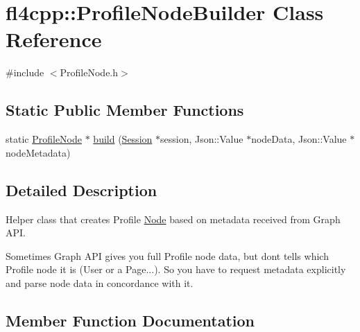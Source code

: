 \hypertarget{classfl4cpp_1_1_profile_node_builder}{}\section{fl4cpp\+:\+:Profile\+Node\+Builder Class Reference}
\label{classfl4cpp_1_1_profile_node_builder}


{\ttfamily \#include $<$Profile\+Node.\+h$>$}

\subsection*{Static Public Member Functions}
\begin{DoxyCompactItemize}
\item 
static \hyperlink{classfl4cpp_1_1_profile_node}{Profile\+Node} $\ast$ \hyperlink{classfl4cpp_1_1_profile_node_builder_a72df89a17997f581256b29fc2d525beb}{build} (\hyperlink{classfl4cpp_1_1_session}{Session} $\ast$session, Json\+::\+Value $\ast$node\+Data, Json\+::\+Value $\ast$node\+Metadata)
\end{DoxyCompactItemize}


\subsection{Detailed Description}
Helper class that creates Profile \hyperlink{classfl4cpp_1_1_node}{Node} based on metadata received from Graph A\+PI.

Sometimes Graph A\+PI gives you full Profile node data, but dont tells which Profile node it is (User or a Page...). So you have to request metadata explicitly and parse node data in concordance with it. 

\subsection{Member Function Documentation}
